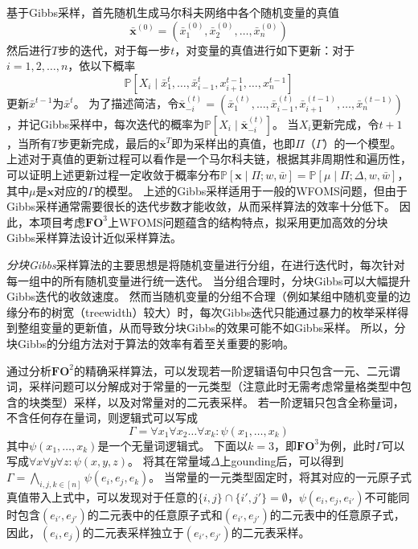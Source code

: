 \documentclass[12pt,UTF8,AutoFakeBold=3,a4paper]{ctexart} %
\newcommand{\sentence}{\Gamma}
\newcommand{\fotwoformula}{\psi}
\newcommand{\weight}{w}
\newcommand{\negweight}{\bar{w}}
\newcommand{\fothree}{\ensuremath{\mathbf{FO}^3}}
\newcommand{\domain}{\Delta}
\newcommand{\vecx}{\mathbf{x}}
\newcommand{\pro}{\mathbb{P}}
\begin{document}
基于Gibbs采样，首先随机生成马尔科夫网络中各个随机变量的真值
\begin{equation*}
    \bar{\vecx}^{(0)} = (\bar{x}_1^{(0)}, \bar{x}_2^{(0)}, \dots, \bar{x}_n^{(0)})
\end{equation*}
然后进行$T$步的迭代，对于每一步$t$，对变量的真值进行如下更新：对于$i=1, 2, \dots, n$，依以下概率
\begin{equation}
    \pro[X_i\mid \bar{x}_1^t, \dots,\bar{x}_{i-1}^t, x_{i+1}^{t-1},\dots, x_n^{t-1}]
    \label{eq:gibbs}
\end{equation}
更新$\bar{x}^{t-1}$为$\bar{x}^t$。
为了描述简洁，令$\bar{\vecx}_{-i}^{(t)} = (\bar{x}_1^{(t)}, \dots, \bar{x}_{i-1}^{(t)}, \bar{x}_{i+1}^{(t-1)}, \dots, \bar{x}_n^{(t-1)})$，并记Gibbs采样中，每次迭代的概率为$\pro[X_i\mid \bar{\vecx}_{-i}^{(t)}]$。
当$X_i$更新完成，令$t+1$，当所有$T$步更新完成，最后的$\bar{\vecx}^T$即为采样出的真值，也即$\Pi$（$\sentence$）的一个模型。
上述对于真值的更新过程可以看作是一个马尔科夫链，根据其非周期性和遍历性，可以证明上述更新过程一定收敛于概率分布$\pro[\vecx\mid \Pi;\weight, \negweight] = \pro[\mu\mid \Pi;\domain, \weight, \negweight]$，其中$\mu$是$\vecx$对应的$\sentence$的模型。
上述的Gibbs采样适用于一般的WFOMS问题，但由于Gibbs采样通常需要很长的迭代步数才能收敛，从而采样算法的效率十分低下。
因此，本项目考虑\fothree{}上WFOMS问题蕴含的结构特点，拟采用更加高效的分块Gibbs采样算法设计近似采样算法。

\emph{分块Gibbs}采样算法的主要思想是将随机变量进行分组，在进行迭代时，每次针对每一组中的所有随机变量进行统一迭代。
当分组合理时，分块Gibbs可以大幅提升Gibbs迭代的收敛速度。
然而当随机变量的分组不合理（例如某组中随机变量的边缘分布的树宽（treewidth）较大）时，每次Gibbs迭代只能通过暴力的枚举采样得到整组变量的更新值，从而导致分块Gibbs的效果可能不如Gibbs采样。
所以，分块Gibbs的分组方法对于算法的效率有着至关重要的影响。

通过分析$\mathbf{FO}^2$的精确采样算法，可以发现若一阶逻辑语句中只包含一元、二元谓词，采样问题可以分解成对于常量的一元类型（注意此时无需考虑常量格类型中包含的块类型）采样，以及对常量对的二元表采样。
若一阶逻辑只包含全称量词，不含任何存在量词，则逻辑式可以写成
\begin{equation*}
    \sentence = \forall x_1\forall x_2\dots\forall x_k: \fotwoformula(x_1,\dots,x_k)
\end{equation*}
其中$\fotwoformula(x_1,\dots,x_k)$是一个无量词逻辑式。
下面以$k=3$，即\fothree{}为例，此时$\sentence$可以写成$\forall x\forall y\forall z: \fotwoformula(x,y,z)$。
将其在常量域$\domain$上gounding后，可以得到$\sentence = \bigwedge_{i,j,k \in[n]}\fotwoformula(e_i, e_j, e_k)$。
当常量的一元类型固定时，将其对应的一元原子式真值带入上式中，可以发现对于任意的$\{i, j\}\cap \{i', j'\}=\emptyset$，$\fotwoformula(e_i, e_j, e_{i'})$不可能同时包含$(e_{i'}, e_{j'})$的二元表中的任意原子式和$(e_{i'}, e_{j'})$的二元表中的任意原子式，因此，$(e_i, e_j)$的二元表采样独立于$(e_{i'}, e_{j'})$的二元表采样。
\end{document}
